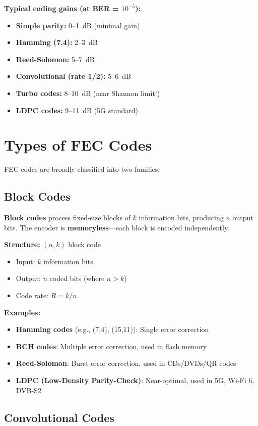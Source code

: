 \textbf{Typical coding gains (at BER = $10^{-5}$):}
\begin{itemize}
\item \textbf{Simple parity:} 0--1~dB (minimal gain)
\item \textbf{Hamming (7,4):} 2--3~dB
\item \textbf{Reed-Solomon:} 5--7~dB
\item \textbf{Convolutional (rate 1/2):} 5--6~dB
\item \textbf{Turbo codes:} 8--10~dB (near Shannon limit!)
\item \textbf{LDPC codes:} 9--11~dB (5G standard)
\end{itemize}

\section{Types of FEC Codes}

FEC codes are broadly classified into two families:

\subsection{Block Codes}

\textbf{Block codes} process fixed-size blocks of $k$ information bits, producing $n$ output bits. The encoder is \textbf{memoryless}---each block is encoded independently.

\textbf{Structure:} $(n, k)$ block code
\begin{itemize}
\item Input: $k$ information bits
\item Output: $n$ coded bits (where $n > k$)
\item Code rate: $R = k/n$
\end{itemize}

\textbf{Examples:}
\begin{itemize}
\item \textbf{Hamming codes} (e.g., (7,4), (15,11)): Single error correction
\item \textbf{BCH codes}: Multiple error correction, used in flash memory
\item \textbf{Reed-Solomon}: Burst error correction, used in CDs/DVDs/QR codes
\item \textbf{LDPC (Low-Density Parity-Check)}: Near-optimal, used in 5G, Wi-Fi 6, DVB-S2
\end{itemize}

\subsection{Convolutional Codes}

